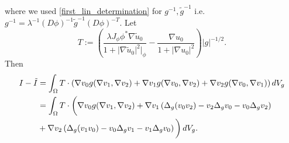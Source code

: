 \documentclass[a4paper, 10pt, twoside, notitlepage]{amsart}
\theoremstyle{plain}
\newcommand{\Om}{\Omega}
\numberwithin{equation}{section}
\newcommand{\abs}[1]{\lvert #1 \rvert}
\begin{document}
where we used \eqref{first_lin_determination} for $g^{-1}, \tilde g^{-1}$ i.e. $g^{-1}=\lambda^{-1}(D\phi)^{-1}\tilde g^{-1}(D\phi)^{-T}$. Let 
\begin{equation}\label{T_def}
	T:=\left(\frac{\lambda J_{\phi} \phi^*\nabla \tilde u_0}{1+\abs{\nabla \tilde u_0}^2|_{\phi}} - \frac{\nabla u_0}{1+\abs{\nabla u_0}^2}\right)\abs{g}^{-1/2}.
\end{equation}
Then
\begin{align}\label{int_identity}
	I-\tilde I &= \int_{\Om} T\cdot(\nabla v_0g(\nabla v_1,\nabla v_2) + \nabla v_1g(\nabla v_0,\nabla v_2) + \nabla v_2g(\nabla v_0,\nabla v_1))\, dV_g \\\notag
	&= \int_{\Om} T\cdot \bigg(\nabla v_0g(\nabla v_1,\nabla v_2) + \nabla v_1\left(\Delta_g(v_0v_2) - v_2\Delta_gv_0 - v_0\Delta_gv_2\right) \\\notag
	& + \nabla v_2\left(\Delta_g(v_1v_0) - v_0\Delta_gv_1 - v_1\Delta_gv_0\right)\bigg)\, dV_g.
\end{align}
\end{document}
